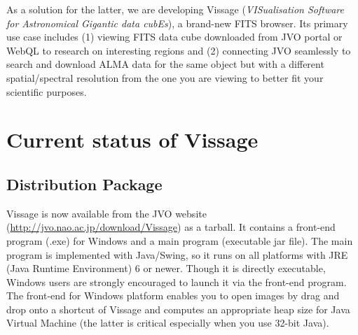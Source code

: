 \documentclass[11pt,twoside]{article}
\begin{document}
As a solution for the latter, we are developing Vissage ({\it VISualisation 
Software for Astronomical Gigantic data cubEs}), a brand-new FITS browser. 
Its primary use case includes (1) viewing FITS data cube downloaded from JVO 
portal or WebQL to research on interesting regions and (2) connecting JVO 
seamlessly to search and download ALMA data for the same object but with a 
different spatial/spectral resolution from the one you are viewing to better 
fit your scientific purposes. 

\section{Current status of Vissage}
\subsection{Distribution Package}
Vissage is now available from the JVO website 
(\url{http://jvo.nao.ac.jp/download/Vissage}) as a tarball. It contains a 
front-end program (.exe) for Windows and a main program (executable jar file). 
The main program is implemented with Java/Swing, so it runs on all platforms 
with JRE (Java Runtime Environment) 6 or newer. Though it is directly 
executable, Windows users are strongly encouraged to launch it via the 
front-end program. The front-end for Windows platform enables you to open images 
by drag and drop onto a shortcut of Vissage and computes an appropriate heap 
size for Java Virtual Machine (the latter is critical especially when you use 
32-bit Java). 
\end{document}
